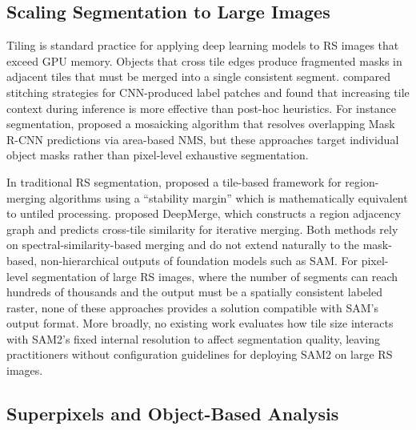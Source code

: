 \documentclass[review,11pt,authoryear]{elsarticle}
\begin{document}
\subsection{Scaling Segmentation to Large Images}
\label{sec:related_tiling}

Tiling is standard practice for applying deep learning models to RS images that exceed GPU memory. Objects that cross tile edges produce fragmented masks in adjacent tiles that must be merged into a single consistent segment. \citet{huang2018tiling} compared stitching strategies for CNN-produced label patches and found that increasing tile context during inference is more effective than post-hoc heuristics. For instance segmentation, \citet{carvalho2021instance} proposed a mosaicking algorithm that resolves overlapping Mask R-CNN predictions via area-based NMS, but these approaches target individual object masks rather than pixel-level exhaustive segmentation.

In traditional RS segmentation, \citet{lassalle2015scalable} proposed a tile-based framework for region-merging algorithms using a ``stability margin'' which is mathematically equivalent to untiled processing. \citet{lv2025deepmerge} proposed DeepMerge, which constructs a region adjacency graph and predicts cross-tile similarity for iterative merging. Both methods rely on spectral-similarity-based merging and do not extend naturally to the mask-based, non-hierarchical outputs of foundation models such as SAM. For pixel-level segmentation of large RS images, where the number of segments can reach hundreds of thousands and the output must be a spatially consistent labeled raster, none of these approaches provides a solution compatible with SAM's output format. More broadly, no existing work evaluates how tile size interacts with SAM2's fixed internal resolution to affect segmentation quality, leaving practitioners without configuration guidelines for deploying SAM2 on large RS images.

\subsection{Superpixels and Object-Based Analysis}
\label{sec:related_superpixels}
\end{document}
